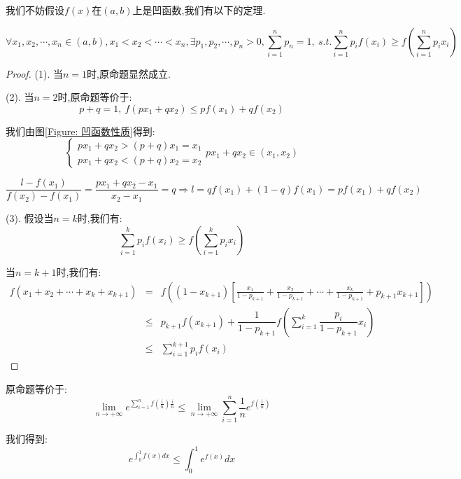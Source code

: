 \begin{solution}
	\begin{anymark}[凹函数性质]
		我们不妨假设$f(x)$在$(a,b)$上是凹函数,我们有以下的定理.
		
		$$\forall x_{1},x_{2},\cdots,x_{n}\in(a,b), x_{1}<x_{2}<\cdots<x_{n}, \exists p_{1},p_{2},\cdots,p_{n}>0,\sum\limits_{i=1}^{n}p_{n}=1,\ s.t. \sum\limits_{i=1}^{n}p_{i}f(x_{i})\geq f(\sum\limits_{i=1}^{n}p_{i}x_{i})$$
		\begin{proof}
			
			(1). 当$n=1$时,原命题显然成立.
			
			(2). 当$n=2$时,原命题等价于: 
			$$p+q=1,\ f(px_{1}+qx_{2})\leq pf(x_{1})+qf(x_{2})$$
			
			我们由图\ref{Figure: 凹函数性质}得到: 
			$$\left\lbrace
			\begin{array}{l}
				px_{1}+qx_{2}>(p+q)x_{1}=x_{1}\\
				px_{1}+qx_{2}<(p+q)x_{2}=x_{2}
			\end{array}
			\right. px_{1}+qx_{2}\in(x_{1},x_{2})$$
			
			$$\dfrac{l-f(x_{1})}{f(x_{2})-f(x_{1})}=\dfrac{px_{1}+qx_{2}-x_{1}}{x_{2}-x_{1}}=q\Rightarrow l=qf(x_{1})+(1-q)f(x_{1})=pf(x_{1})+qf(x_{2})$$
			
			(3). 假设当$n=k$时,我们有: $$\sum\limits_{i=1}^{k}p_{i}f(x_{i})\geq f(\sum\limits_{i=1}^{k}p_{i}x_{i})$$
			
			当$n=k+1$时,我们有: 
			\begin{eqnarray*}
				f(x_{1}+x_{2}+\cdots+x_{k}+x_{k+1})&=&f((1-x_{k+1})[\frac{x_{1}}{1-p_{k+1}}+\frac{x_{2}}{1-p_{k+1}}+\cdots+\frac{x_{k}}{1-p_{k+1}}+p_{k+1}x_{k+1}])\\
				&\leq& p_{k+1}f(x_{k+1})+\dfrac{1}{1-p_{k+1}}f(\sum\limits_{i=1}^{k}\dfrac{p_{i}}{1-p_{k+1}}x_{i})\\
				&\leq & \sum\limits_{i=1}^{k+1}p_{i}f(x_{i})
			\end{eqnarray*}
		\end{proof}
	\end{anymark}
	原命题等价于: 
	$$\lim\limits_{n\rightarrow+\infty}e^{\sum\limits_{i=1}^{n}f(\frac{i}{n})\frac{i}{n}}\leq \lim\limits_{n\rightarrow+\infty}\sum\limits_{i=1}^{n}\frac{1}{n}e^{f(\frac{i}{n})}$$
	
	我们得到: 
	$$e^{\int_{0}^{1}f(x)dx}\leq \int_{0}^{1}e^{f(x)}dx$$
\end{solution}

